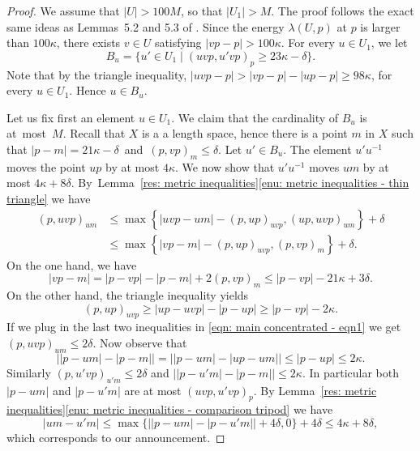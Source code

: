 \documentclass[11pt]{article}
\theoremstyle{plain}
\theoremstyle{definition}
\begin{document}
\begin{proof}
We assume that $|U| > 100M$, so that $|U_1| > M$.
The proof follows the exact same ideas as Lemmas~5.2 and 5.3 of \cite{delzant_product_2020}.
Since the energy $\lambda(U,p)$ at $p$ is larger than $100\kappa$, there exists $v \in U$ satisfying $|vp - p| > 100\kappa$.
For every $u \in U_1$, we let
\begin{equation*}
B_u =\{ u' \in U_1 \mid (uvp, u'vp)_p \geq 23\kappa - \delta\}.
\end{equation*}
Note that by the triangle inequality, $|uvp - p| > |vp - p| - |up - p| \geq 98\kappa$, for every $u \in U_1$.
Hence $u \in B_u$.

Let us fix first an element $u \in U_1$.
We claim that the cardinality of $B_u$ is at~most~$M$.
Recall that $X$ is a a length space, hence there is a point $m$ in $X$ such that \hbox{$|p - m | = 21\kappa - \delta$ and $(p,vp)_m \leq \delta$}.
Let $u' \in B_u$.
The element $u'u^{-1}$ moves the point $up$ by at most $4\kappa$.
We now show that $u'u^{-1}$ moves $um$ by at most $4\kappa + 8\delta$.
By~Lemma~\ref{res: metric inequalities}\eqref{enu: metric inequalities - thin triangle} we have
\begin{equation}
\begin{split}
(p, uvp)_{um}
& \leq \max\left\{|uvp - um| - (p,up)_{uvp}, (up,uvp)_{um}\right\} + \delta \\
& \leq \max\left\{|vp - m| - (p,up)_{uvp}, (p,vp)_{m}\right\} + \delta.
\end{split}
\label{eqn: main concentrated - eqn1}
\end{equation}
On the one hand, we have
\begin{equation*}
|vp - m| = |p - vp| - |p - m| + 2 (p,vp)_m \leq |p - vp| - 21 \kappa + 3\delta.
\end{equation*}
On the other hand, the triangle inequality yields
\begin{equation*}
(p,up)_{uvp} \geq |up - uvp| - |p - up| \geq |p - vp| - 2\kappa.
\end{equation*}
If we plug in the last two inequalities in \eqref{eqn: main concentrated - eqn1} we get $(p, uvp)_{um} \leq 2 \delta$.
Now observe that
\begin{equation*}
\bigl||p-um| - |p - m| \bigr| = \bigl||p-um| - |up - um| \bigr| \leq |p- up| \leq 2\kappa.
\end{equation*}
Similarly $(p, u'vp)_{u'm} \leq 2 \delta$ and $\bigl||p-u'm| - |p - m| \bigr| \leq 2\kappa$.
In particular both $|p - um|$ and $|p - u'm|$ are at most $(uvp,u'vp)_p$.
By Lemma~\ref{res: metric inequalities}\eqref{enu: metric inequalities - comparison tripod} we have
\begin{equation*}
|um - u'm| \leq \max \bigl\{ \bigl||p-um| - |p - u'm| \bigr| + 4 \delta, 0 \bigr\}+ 4\delta
\leq 4\kappa + 8\delta,
\end{equation*}
which corresponds to our announcement.


\end{proof}
\end{document}
